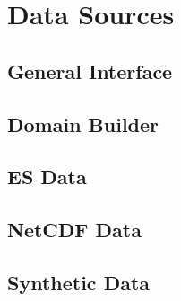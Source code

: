 \chapter{Data Sources}\label{Chp:ref:data sources}

\section{General Interface}

\section{Domain Builder}

\section{ES Data}

\section{NetCDF Data}

\section{Synthetic Data}
